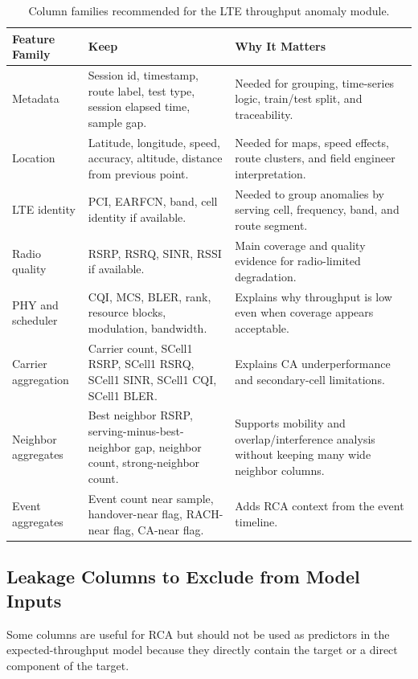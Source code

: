\documentclass[12pt,a4paper]{article}
\begin{document}
\begin{table}[H]
\centering
\begin{tabularx}{\textwidth}{@{}L{0.24\textwidth}YY@{}}
\toprule
\textbf{Feature Family} & \textbf{Keep} & \textbf{Why It Matters} \\
\midrule
Metadata & Session id, timestamp, route label, test type, session elapsed time, sample gap. & Needed for grouping, time-series logic, train/test split, and traceability. \\
Location & Latitude, longitude, speed, accuracy, altitude, distance from previous point. & Needed for maps, speed effects, route clusters, and field engineer interpretation. \\
LTE identity & PCI, EARFCN, band, cell identity if available. & Needed to group anomalies by serving cell, frequency, band, and route segment. \\
Radio quality & RSRP, RSRQ, SINR, RSSI if available. & Main coverage and quality evidence for radio-limited degradation. \\
PHY and scheduler & CQI, MCS, BLER, rank, resource blocks, modulation, bandwidth. & Explains why throughput is low even when coverage appears acceptable. \\
Carrier aggregation & Carrier count, SCell1 RSRP, SCell1 RSRQ, SCell1 SINR, SCell1 CQI, SCell1 BLER. & Explains CA underperformance and secondary-cell limitations. \\
Neighbor aggregates & Best neighbor RSRP, serving-minus-best-neighbor gap, neighbor count, strong-neighbor count. & Supports mobility and overlap/interference analysis without keeping many wide neighbor columns. \\
Event aggregates & Event count near sample, handover-near flag, RACH-near flag, CA-near flag. & Adds RCA context from the event timeline. \\
\bottomrule
\end{tabularx}
\caption{Column families recommended for the LTE throughput anomaly module.}
\end{table}

\subsection{Leakage Columns to Exclude from Model Inputs}

Some columns are useful for RCA but should not be used as predictors in the expected-throughput model because they directly contain the target or a direct component of the target.
\end{document}
